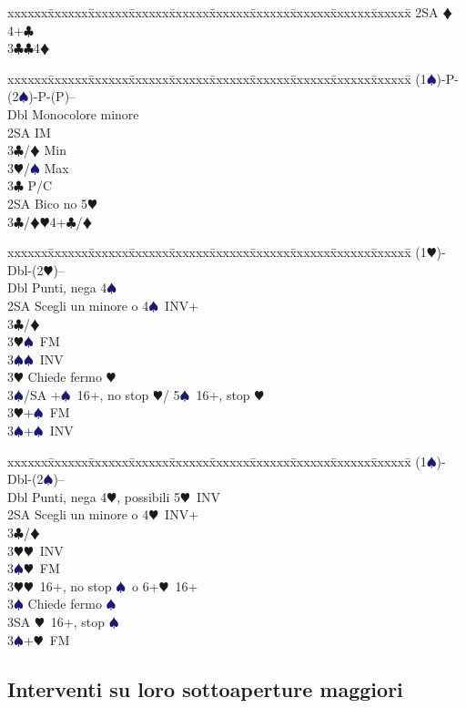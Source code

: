 \documentclass[a4paper,italian]{article}
\newcommand{\BC}{\textcolor{OliveGreen}{$\clubsuit$}}
\newcommand{\BD}{\textcolor{RedOrange}{$\vardiamondsuit$}}
\newcommand{\BH}{\textcolor{Red2}{$\varheartsuit${}}}
\newcommand{\BS}{\textcolor{MidnightBlue}{$\spadesuit${}}}
\newenvironment{bidtable}
{\begin{tabbing}

    xxxxxx\=xxxxxx\=xxxxxx\=xxxxxx\=xxxxxx\=xxxxxx\=xxxxxx\=xxxxxx\=xxxxxx\=xxxxxx\=\kill}
{\end{tabbing} }%
\begin{document}
\begin{multicols}{2}
\begin{bidtable}
        2SA \BD 4+\BC \\
        3\BC {}\BC 4\BD
    \end{bidtable}
    \vfill\null
    \columnbreak
    \begin{bidtable}
        (1\BS)-P-(2\BS)-P-(P)--\+\\
        Dbl \> Monocolore minore\+\\
        2SA \> IM\+\\
        3\BC/\BD \> Min\\
        3\BH/\BS \> Max\-\\
        3\BC \> P/C\-\\
        2SA \> Bico no 5\BH \\
        3\BC/\BD {}\BH 4+\BC /\BD
    \end{bidtable}
    \begin{bidtable}
        (1\BH)-Dbl-(2\BH)--\+\\
        Dbl\> Punti, nega 4\BS\\
        2SA \> Scegli un minore o 4\BS\ INV+\+\\
        3\BC/\BD\+\\
        3\BH {}\BS\ FM\\
        3\BS {}\BS\ INV\-\\
        3\BH \> Chiede fermo \BH\\
        3\BS/SA +\BS\ 16+, no stop \BH / 5\BS\ 16+, stop \BH\-\\
        3\BH {}+\BS\ FM\\
        3\BS {}+\BS\ INV
    \end{bidtable}
    \begin{bidtable}
        (1\BS)-Dbl-(2\BS)--\+\\
        Dbl\> Punti, nega 4\BH, possibili 5\BH\ INV\\
        2SA \> Scegli un minore o 4\BH\ INV+\+\\
        3\BC/\BD\+\\
        3\BH {}\BH\ INV\\
        3\BS {}\BH\ FM\-\\
        3\BH {}\BH\ 16+, no stop \BS\ o 6+\BH\ 16+\\
        3\BS \> Chiede fermo \BS\\
        3SA \BH\ 16+, stop \BS\-\\
        3\BS {}+\BH\ FM
    \end{bidtable}

    \subsection{Interventi su loro sottoaperture maggiori}


\end{multicols}
\end{document}
